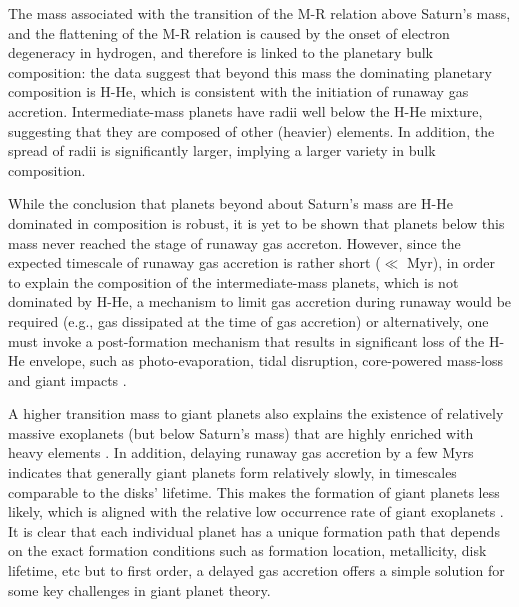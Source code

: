 \documentclass{aa}
\begin{document}
{The mass associated with the transition of the M-R relation above Saturn's mass, and the flattening of the M-R relation is caused by the onset of electron degeneracy in hydrogen, and therefore is linked to the planetary bulk composition: the data suggest that beyond this mass the dominating planetary composition is H-He, which is consistent with the initiation of runaway gas accretion. 
Intermediate-mass planets have radii well below the H-He mixture, suggesting that they are composed of other (heavier) elements. In addition, the spread of radii is significantly larger, implying a larger variety in bulk composition. 
\par 

While the conclusion that planets beyond about Saturn's mass are H-He dominated in composition is robust, it is yet to be shown that planets below this mass never reached the stage of runaway gas accreton. 
However, since the expected timescale of runaway gas accretion is rather short ($\ll$ Myr), in order to explain the composition of the intermediate-mass planets, which is not dominated by H-He,  a mechanism to limit gas accretion during runaway would be required (e.g., gas dissipated at the time of gas accretion) or alternatively, one must invoke a post-formation mechanism that results in significant loss of the H-He envelope, such as photo-evaporation, tidal disruption, core-powered mass-loss and giant impacts \cite[e.g.,][]{2012MNRAS.425.2931O, 2018MNRAS.479.5012O,2018MNRAS.476..759G, 2021A&A...648L...1O}. 
\par

 A higher transition mass to giant planets also explains the existence of relatively massive exoplanets (but below Saturn's mass) that are highly enriched with heavy elements \citep[e.g.,][]{2020AJ....160..235B}. 
In addition, delaying runaway gas accretion by a few Myrs indicates that generally giant planets form relatively slowly, in timescales comparable to the disks' lifetime. This makes the formation of giant planets less likely, which is aligned with the relative low occurrence rate of giant exoplanets \citep[e.g.,][]{2015A&A...574A.116R, 2021ApJS..255...14F}.  
It is clear that each individual planet has a unique formation path that depends on the exact formation conditions such as formation location, metallicity, disk lifetime, etc but to first order, a delayed gas accretion offers a simple solution for some key challenges in giant planet theory.

}
\end{document}
